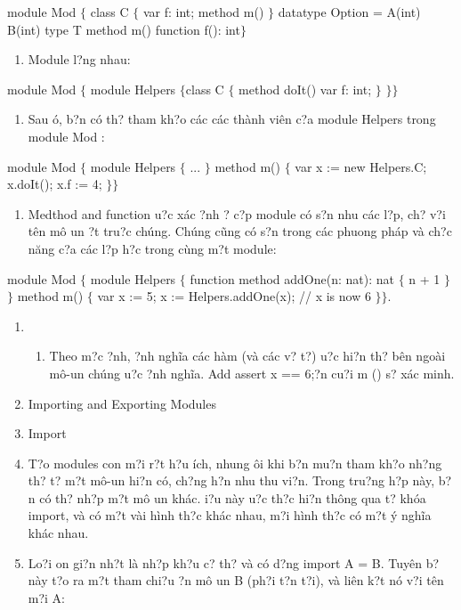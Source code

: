 \documentclass{article} %
\begin{document}
\noindent  module Mod $\{$  class C $\{$    var f: int;    method m()  $\}$  datatype Option = A(int) {\textbar} B(int)  type T  method m()  function f(): int$\}$

\begin{enumerate}
\item  Module l?ng nhau:
\end{enumerate}

\noindent module Mod $\{$  module Helpers $\{$class C $\{$      method doIt()      var f: int;       $\}$   $\}$$\}$

\begin{enumerate}
\item  Sau {\dj}\'{o}, b?n c\'{o} th? tham kh?o c\'{a}c c\'{a}c th\`{a}nh vi\^{e}n c?a module  Helpers trong module Mod  :
\end{enumerate}

\noindent module Mod $\{$  module Helpers $\{$ ... $\}$  method m() $\{$    var x := new Helpers.C;    x.doIt();    x.f := 4;   $\}$$\}$

\begin{enumerate}
\item  Medthod and function {\dj}u?c x\'{a}c {\dj}?nh ? c?p module c\'{o} s?n nhu c\'{a}c l?p, ch? v?i t\^{e}n m\^{o} {\dj}un {\dj}?t tru?c ch\'{u}ng. Ch\'{u}ng c\~{u}ng c\'{o} s?n trong c\'{a}c phuong ph\'{a}p v\`{a} ch?c n\u{a}ng c?a c\'{a}c l?p h?c trong c\`{u}ng m?t module:
\end{enumerate}

\noindent module Mod $\{$  module Helpers $\{$    function method addOne(n: nat): nat $\{$      n + 1    $\}$  $\}$  method m() $\{$    var x := 5;    x := Helpers.addOne(x); // x is now 6  $\}$$\}$.

\begin{enumerate}
\item \begin{enumerate}
\item  Theo m?c {\dj}?nh, {\dj}?nh ngh\~{i}a c\'{a}c h\`{a}m (v\`{a} c\'{a}c v? t?) {\dj}u?c hi?n th? b\^{e}n ngo\`{a}i m\^{o}-{\dj}un ch\'{u}ng {\dj}u?c {\dj}?nh ngh\~{i}a. Add assert x == 6;{\dj}?n cu?i m () s? x\'{a}c minh.
\end{enumerate}

\item  Importing and Exporting Modules

\item  Import

\item  T?o modules con m?i r?t h?u \'{i}ch, nhung {\dj}\^{o}i khi b?n mu?n tham kh?o nh?ng th? t? m?t m\^{o}-{\dj}un hi?n c\'{o}, ch?ng h?n nhu thu vi?n. Trong tru?ng h?p n\`{a}y, b?n c\'{o} th? nh?p m?t m\^{o} {\dj}un kh\'{a}c. {\DJ}i?u n\`{a}y {\dj}u?c th?c hi?n th\^{o}ng qua t? kh\'{o}a import, v\`{a} c\'{o} m?t v\`{a}i h\`{i}nh th?c kh\'{a}c nhau, m?i h\`{i}nh th?c c\'{o} m?t \'{y} ngh\~{i}a kh\'{a}c nhau.

\item  Lo?i {\dj}on gi?n nh?t l\`{a} nh?p kh?u c? th? v\`{a} c\'{o} d?ng import A = B. Tuy\^{e}n b? n\`{a}y t?o ra m?t tham chi?u {\dj}?n m\^{o} {\dj}un B (ph?i t?n t?i), v\`{a} li\^{e}n k?t n\'{o} v?i t\^{e}n m?i A:
\end{enumerate}
\end{document}
